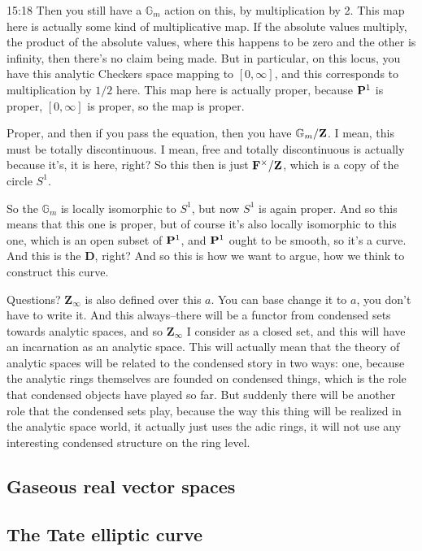 \begin{unfinished}{15:18}
Then you still have a $\mathbb{G}_m$ action on this, by multiplication by 2. This map here is actually some kind of multiplicative map. If the absolute values multiply, the product of the absolute values, where this happens to be zero and the other is infinity, then there's no claim being made. But in particular, on this locus, you have this analytic Checkers space mapping to $[0,\infty]$, and this corresponds to multiplication by $1/2$ here. This map here is actually proper, because $\P^1$ is proper, $[0,\infty]$ is proper, so the map is proper.

Proper, and then if you pass the equation, then you have $\mathbb{G}_m / \Z$. I mean, this must be totally discontinuous. I mean, free and totally discontinuous is actually because it's, it is here, right? So this then is just $\F^\times / \Z$, which is a copy of the circle $S^1$. 

So the $\mathbb{G}_m$ is locally isomorphic to $S^1$, but now $S^1$ is again proper. And so this means that this one is proper, but of course it's also locally isomorphic to this one, which is an open subset of $\P^1$, and $\P^1$ ought to be smooth, so it's a curve. And this is the $\mathbf{D}$, right? And so this is how we want to argue, how we think to construct this curve.

Questions? $\mathbf{Z}_\infty$ is also defined over this $a$. You can base change it to $a$, you don't have to write it. And this always--there will be a functor from condensed sets towards analytic spaces, and so $\mathbf{Z}_\infty$ I consider as a closed set, and this will have an incarnation as an analytic space. This will actually mean that the theory of analytic spaces will be related to the condensed story in two ways: one, because the analytic rings themselves are founded on condensed things, which is the role that condensed objects have played so far. But suddenly there will be another role that the condensed sets play, because the way this thing will be realized in the analytic space world, it actually just uses the adic rings, it will not use any interesting condensed structure on the ring level.

\end{unfinished}
\subsection{\ufs Gaseous real vector spaces}
\subsection{\ufs The Tate elliptic curve}